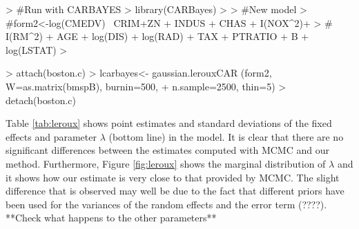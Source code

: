 \documentclass[article]{jss}
\begin{document}
\begin{Schunk}
\begin{Sinput}
> #Run with CARBAYES
> library(CARBayes)
> 
> #New model
> #form2<-log(CMEDV) ~CRIM+ZN + INDUS + CHAS + I(NOX^2)+
> #   I(RM^2) +  AGE + log(DIS) + log(RAD) + TAX + PTRATIO + B + log(LSTAT)
> 
\end{Sinput}
\end{Schunk}
\begin{Schunk}
\begin{Sinput}
> attach(boston.c)
> lcarbayes<- gaussian.lerouxCAR (form2, W=as.matrix(bmspB), burnin=500, 
+    n.sample=2500, thin=5)
> detach(boston.c)
\end{Sinput}
\end{Schunk}

Table \ref{tab:leroux} shows point estimates and standard deviations of the
fixed effects and parameter $\lambda$ (bottom line) in the model. It is clear
that there are no significant differences between the estimates computed with
MCMC and our method.  Furthermore, Figure \ref{fig:leroux} shows the marginal
distribution of $\lambda$ and it shows how our estimate is very close to that
provided by MCMC. The slight difference that is observed may well be due to the
fact that different priors have been used for the variances of the random
effects and the error term (????). **Check what happens to the other parameters**
\end{document}
